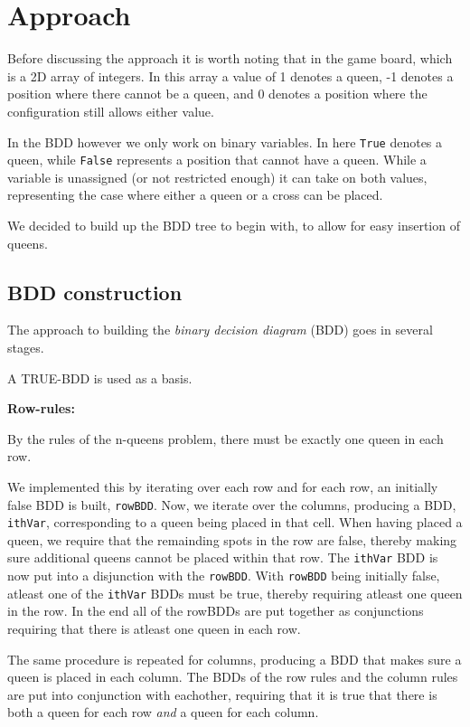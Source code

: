
\section{Approach}
Before discussing the approach it is worth noting that in the game board, which is a 2D array of integers. In this array a value of 1 denotes a queen, -1 denotes a position where there cannot be a queen, and 0 denotes a position where the configuration still allows either value.

\newpar In the BDD however we only work on binary variables. In here \texttt{True} denotes a queen, while \texttt{False} represents a position that cannot have a queen. While a variable is unassigned (or not restricted enough) it can take on both values, representing the case where either a queen or a cross can be placed.

We decided to build up the BDD tree to begin with, to allow for easy insertion of queens.

\subsection{BDD construction}
The approach to building the \textit{binary decision diagram} (BDD) goes in several stages.

A TRUE-BDD is used as a basis. 

\newpar
\textbf{Row-rules:}

By the rules of the n-queens problem, there must be exactly one queen in each row.

\newpar
We implemented this by iterating over each row and for each row, an initially false BDD is built, \texttt{rowBDD}. Now, we iterate over the columns, producing a BDD, \texttt{ithVar}, corresponding to a queen being placed in that cell. When having placed a queen, we require that the remainding spots in the row are false, thereby making sure additional queens cannot be placed within that row. The \texttt{ithVar} BDD is now put into a disjunction with the \texttt{rowBDD}.  With \texttt{rowBDD} being initially false, atleast one of the \texttt{ithVar} BDDs must be true, thereby requiring atleast one queen in the row. In the end all of the rowBDDs are put together as conjunctions requiring that there is atleast one queen in each row.

\newpar The same procedure is repeated for columns, producing a BDD that makes sure a queen is placed in each column. The BDDs of the row rules and the column rules are put into conjunction with eachother, requiring that it is true that there is both a queen for each row \textit{and} a queen for each column.

